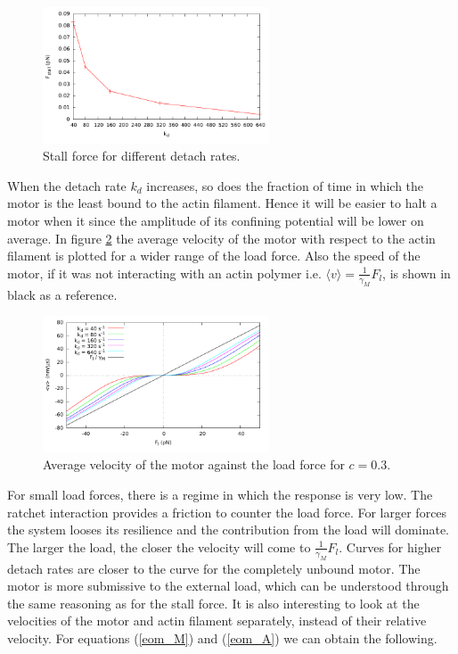 \documentclass[aps,pre,onecolumn,showpacs,showkeys,a4paper]{revtex4}
\begin{document}
\begin{figure}[h]
\centering
\includegraphics[width=0.6\textwidth,height=!]{k_Fstall}
\caption{Stall force for different detach rates.}
\label{Fig: k_Fstall} 
\end{figure}
When the detach rate $k_{d}$ increases, so does the fraction of time in which the motor is the least bound to the actin filament. 
Hence it will be easier to halt a motor when it since the amplitude of its confining potential will be lower on average.
In figure \ref{Fig: F_v} the average velocity of the motor with respect to the actin filament is plotted for a wider range of the load force. 
Also the speed of the motor, if it was not  interacting with an actin polymer i.e. $\langle v \rangle = \frac{1}{\gamma_M}F_l$, is shown in black as a reference.
\begin{figure}[h]
\centering
\includegraphics[width=0.6\textwidth,height=!]{F_v}
\caption{Average velocity of the motor against the load force for $c=0.3$.}
\label{Fig: F_v} 
\end{figure}
For small load forces, there is a regime in which the response is very low. 
The ratchet interaction provides a friction to counter the load force. 
For larger forces the system looses its resilience and the contribution from the load will dominate. 
The larger the load, the closer the velocity will come to  $\frac{1}{\gamma_M}F_l$.
Curves for higher detach rates are closer to the curve for the completely unbound motor. 
The motor is more submissive to the external load, which can be understood through the same reasoning as for the stall force.
It is also interesting to look at the velocities of the motor and actin filament separately, instead of their relative velocity. 
For equations (\ref{eom_M}) and (\ref{eom_A}) we can obtain the following.
\end{document}
